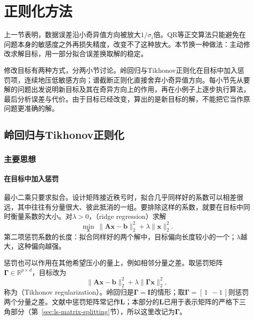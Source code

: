 \section{正则化方法}
\label{sec:ls-truncated-svd-ridge}

上一节表明，数据误差沿小奇异值方向被放大$1/\sigma_i$倍。QR等正交算法只能避免在问题本身的敏感度之外再损失精度，改变不了这种放大。本节换一种做法：主动修改求解目标，用一部分拟合误差换取解的稳定。

修改目标有两种方式，分两小节讨论。岭回归与Tikhonov正则化在目标中加入惩罚项，连续地压低敏感方向；谱截断正则化直接舍弃小奇异值方向。每小节先从要解的问题出发说明新目标及其在奇异方向上的作用，再在小例子上逐步执行算法，最后分析误差与代价。由于目标已经改变，算出的是新目标的解，不能把它当作原问题更准确的解。

\subsection{岭回归与Tikhonov正则化}
\label{sec:ls-regularized-ls}

\subsubsection{主要思想}

\paragraph{在目标中加入惩罚}
最小二乘只要求拟合。设计矩阵接近秩亏时，拟合几乎同样好的系数可以相差很远，其中往往有分量很大、彼此抵消的一组。要排除这样的系数，就要在目标中同时衡量系数的大小。对$\lambda>0$，（ridge regression）求解
\begin{equation}
 \min_{\bm x}\ \lVert\bm A\bm x-\bm b\rVert_2^2+\lambda\lVert\bm x\rVert_2^2 .
 \label{eq:ls-ridge-objective}
\end{equation}
第二项惩罚系数的长度：拟合同样好的两个解中，目标偏向长度较小的一个；$\lambda$越大，这种偏向越强。

惩罚也可以作用在其他希望压小的量上，例如相邻分量之差。取惩罚矩阵$\bm\Gamma\in\mathbb R^{p\times d}$，目标改为
\begin{equation}
 \lVert\bm A\bm x-\bm b\rVert_2^2+\lambda\lVert\bm\Gamma\bm x\rVert_2^2 ,
 \label{eq:ls-tikhonov-objective}
\end{equation}
称为（Tikhonov regularization）。岭回归是$\bm\Gamma=\bm I$的情形；取$\bm\Gamma=[\,1\ \ -1\,]$则惩罚两个分量之差。文献中惩罚矩阵常记作$\bm L$；本部分的$\bm L$已用于表示矩阵的严格下三角部分（第~\ref{sec:ls-matrix-splitting}节），所以这里改记为$\bm\Gamma$。

